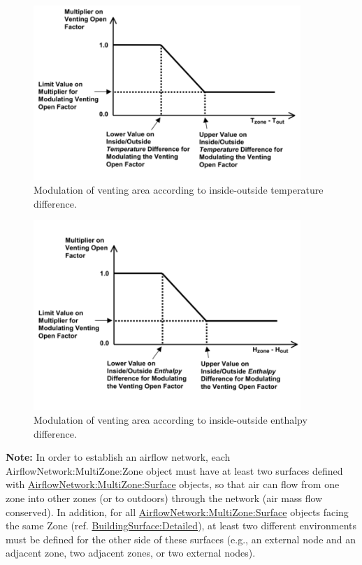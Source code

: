 \begin{figure}[hbtp] %
\centering
\includegraphics[width=0.9\textwidth, height=0.9\textheight, keepaspectratio=true]{media/image222.png}
\caption{Modulation of venting area according to inside-outside temperature difference. \protect \label{fig:modulation-of-venting-area-according-to}}
\end{figure}

\begin{figure}[hbtp] %
\centering
\includegraphics[width=0.9\textwidth, height=0.9\textheight, keepaspectratio=true]{media/image223.png}
\caption{Modulation of venting area according to inside-outside enthalpy difference. \protect \label{fig:modulation-of-venting-area-according-to-001}}
\end{figure}

\textbf{Note:} In order to establish an airflow network, each AirflowNetwork:MultiZone:Zone object must have at least two surfaces defined with \hyperref[airflownetworkmultizonesurface]{AirflowNetwork:MultiZone:Surface} objects, so that air can flow from one zone into other zones (or to outdoors) through the network (air mass flow conserved). In addition, for all \hyperref[airflownetworkmultizonesurface]{AirflowNetwork:MultiZone:Surface} objects facing the same Zone (ref. \hyperref[buildingsurfacedetailed]{BuildingSurface:Detailed}), at least two different environments must be defined for the other side of these surfaces (e.g., an external node and an adjacent zone, two adjacent zones, or two external nodes).

